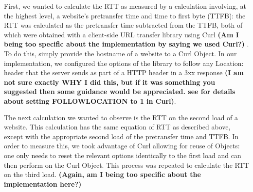 \documentclass[twocolumn, 10pt, conference]{IEEEtran}
\begin{document}

First, we wanted to calculate the RTT as measured by a calculation involving, at the highest level, a website's pretransfer time and time to first byte (TTFB): the RTT was calculated as the pretransfer time subtracted from the TTFB, both of which were obtained with a client-side URL transfer library using Curl 
\textbf{(Am I being too specific about the implementation by saying we used Curl?)}
\cite{pycurldocs}. To do this, simply provide the hostname of a website to a Curl Object. In our implementation, we configured the options of the library to follow any Location: header that the server sends as part of a HTTP header in a 3xx response \cite{curloptfollowlocationdocs} 
\textbf{(I am not sure exactly WHY I did this, but if it was something you suggested then some guidance would be appreciated. see \cite{curloptfollowlocationdocs}
for details about setting FOLLOWLOCATION to 1 in Curl)}.


The next calculation we wanted to observe is the RTT on the second load of a website. This calculation has the same equation of RTT as described above, except with the appropriate second load of the pretransfer time and TTFB. In order to measure this, we took advantage of Curl allowing for reuse of Objects: one only needs to reset the relevant options identically to the first load and can then perform on the Curl Object. This process was repeated to calculate the RTT on the third load.
\textbf{(Again, am I being too specific about the implementation here?)}
\end{document}
